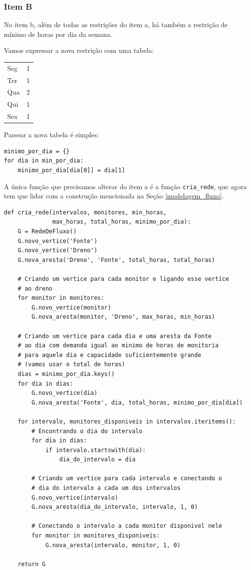 \documentclass[11pt]{article}
\begin{document}
\subsubsection{Item B}
\label{sec-2-5-2}

No item b, além de todas as restrições do item a, há também a
restrição de mínimo de horas por dia da semana.

Vamos expressar a nova restrição com uma tabela:

\begin{center}
\begin{tabular}{lr}
Seg & 1\\
Ter & 1\\
Qua & 2\\
Qui & 1\\
Sex & 1\\
\end{tabular}
\end{center}

Parsear a nova tabela é simples:
\begin{verbatim}
minimo_por_dia = {}
for dia in min_por_dia:
    minimo_por_dia[dia[0]] = dia[1]
\end{verbatim}

A única função que precisamos alterar do item a é a função
\verb~cria_rede~, que agora tem que lidar com a construção mencionada na
Seção \ref{modelagem_fluxo}.

\begin{verbatim}
def cria_rede(intervalos, monitores, min_horas,
              max_horas, total_horas, minimo_por_dia):
    G = RedeDeFluxo()
    G.novo_vertice('Fonte')
    G.novo_vertice('Dreno')
    G.nova_aresta('Dreno', 'Fonte', total_horas, total_horas)

    # Criando um vertice para cada monitor e ligando esse vertice
    # ao dreno
    for monitor in monitores:
        G.novo_vertice(monitor)
        G.nova_aresta(monitor, 'Dreno', max_horas, min_horas)

    # Criando um vertice para cada dia e uma aresta da Fonte
    # ao dia com demanda igual ao minimo de horas de monitoria
    # para aquele dia e capacidade suficientemente grande
    # (vamos usar o total de horas)
    dias = minimo_por_dia.keys()
    for dia in dias:
        G.novo_vertice(dia)
        G.nova_aresta('Fonte', dia, total_horas, minimo_por_dia[dia])

    for intervalo, monitores_disponiveis in intervalos.iteritems():
        # Encontrando o dia do intervalo
        for dia in dias:
            if intervalo.startswith(dia):
                dia_do_intervalo = dia

        # Criando um vertice para cada intervalo e conectando o
        # dia do intervalo a cada um dos intervalos
        G.novo_vertice(intervalo)
        G.nova_aresta(dia_do_intervalo, intervalo, 1, 0)

        # Conectando o intervalo a cada monitor disponivel nele
        for monitor in monitores_disponiveis:
            G.nova_aresta(intervalo, monitor, 1, 0)

    return G
\end{verbatim}
\end{document}
